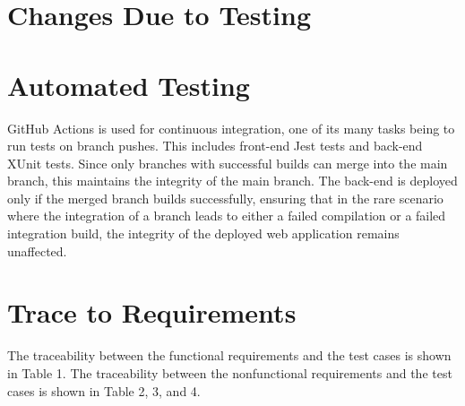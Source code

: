 \documentclass[12pt, titlepage]{article}
\begin{document}
\section{Changes Due to Testing}


\section{Automated Testing}

GitHub Actions is used for continuous integration, one of its many tasks being to run tests on branch pushes. This includes front-end Jest tests and back-end XUnit tests. Since only branches with successful builds can merge into the main branch, this maintains the integrity of the main branch. The back-end is deployed only if the merged branch builds successfully, ensuring that in the rare scenario where the integration of a branch leads to either a failed compilation or a failed integration build, the integrity of the deployed web application remains unaffected.
		
\section{Trace to Requirements}
The traceability between the functional requirements and the test cases is shown in Table 1. The traceability between the nonfunctional requirements and the test cases is shown in Table 2, 3, and 4. 
\end{document}
